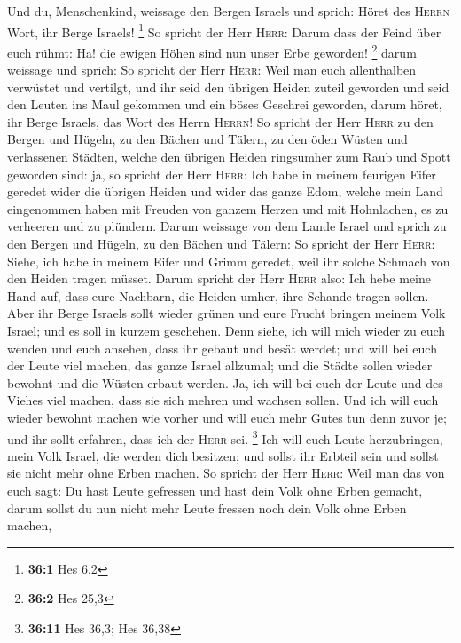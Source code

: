  Und du, Menschenkind, weissage den Bergen Israels und
sprich: Höret des \textsc{Herrn} Wort, ihr Berge Israels! \footnote{\textbf{36:1}
  Hes 6,2}  So spricht der Herr \textsc{Herr}: Darum dass
der Feind über euch rühmt: Ha! die ewigen Höhen sind nun unser Erbe
geworden! \footnote{\textbf{36:2} Hes 25,3}  darum
weissage und sprich: So spricht der Herr \textsc{Herr}: Weil man euch
allenthalben verwüstet und vertilgt, und ihr seid den übrigen Heiden
zuteil geworden und seid den Leuten ins Maul gekommen und ein böses
Geschrei geworden,  darum höret, ihr Berge Israels, das
Wort des Herrn \textsc{Herrn}! So spricht der Herr \textsc{Herr} zu den
Bergen und Hügeln, zu den Bächen und Tälern, zu den öden Wüsten und
verlassenen Städten, welche den übrigen Heiden ringsumher zum Raub und
Spott geworden sind:  ja, so spricht der Herr
\textsc{Herr}: Ich habe in meinem feurigen Eifer geredet wider die
übrigen Heiden und wider das ganze Edom, welche mein Land eingenommen
haben mit Freuden von ganzem Herzen und mit Hohnlachen, es zu verheeren
und zu plündern.  Darum weissage von dem Lande Israel und
sprich zu den Bergen und Hügeln, zu den Bächen und Tälern: So spricht
der Herr \textsc{Herr}: Siehe, ich habe in meinem Eifer und Grimm
geredet, weil ihr solche Schmach von den Heiden tragen müsset.
 Darum spricht der Herr \textsc{Herr} also: Ich hebe meine
Hand auf, dass eure Nachbarn, die Heiden umher, ihre Schande tragen
sollen.  Aber ihr Berge Israels sollt wieder grünen und
eure Frucht bringen meinem Volk Israel; und es soll in kurzem geschehen.
 Denn siehe, ich will mich wieder zu euch wenden und euch
ansehen, dass ihr gebaut und besät werdet;  und will bei
euch der Leute viel machen, das ganze Israel allzumal; und die Städte
sollen wieder bewohnt und die Wüsten erbaut werden.  Ja,
ich will bei euch der Leute und des Viehes viel machen, dass sie sich
mehren und wachsen sollen. Und ich will euch wieder bewohnt machen wie
vorher und will euch mehr Gutes tun denn zuvor je; und ihr sollt
erfahren, dass ich der \textsc{Herr} sei. \footnote{\textbf{36:11} Hes
  36,3; Hes 36,38}  Ich will euch Leute herzubringen,
mein Volk Israel, die werden dich besitzen; und sollst ihr Erbteil sein
und sollst sie nicht mehr ohne Erben machen.  So spricht
der Herr \textsc{Herr}: Weil man das von euch sagt: Du hast Leute
gefressen und hast dein Volk ohne Erben gemacht,  darum
sollst du nun nicht mehr Leute fressen noch dein Volk ohne Erben machen,
